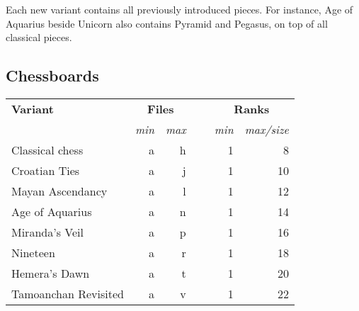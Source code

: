Each new variant contains all previously introduced pieces. For instance, Age of Aquarius
beside Unicorn also contains Pyramid and Pegasus, on top of all classical pieces.

\clearpage %

\subsection*{Chessboards}
\label{sec:Appendix/Introduction/Chessboards}

\begin{table}[!h]
\centering
\begin{tabular}{ lrrcrr }
\toprule %
\textbf{Variant}      & \multicolumn{2}{c}{ \textbf{Files} } & ~ & \multicolumn{2}{c}{ \textbf{Ranks} }   \\
                      \cmidrule{2-3}                             \cmidrule{5-6} %
                      & \emph{min} & \emph{max}              &   & \emph{min} & \emph{max/size}           \\
\midrule %
Classical chess       & a          & h                       &   & 1          &  8                        \\
Croatian Ties         & a          & j                       &   & 1          & 10                        \\
Mayan Ascendancy      & a          & l                       &   & 1          & 12                        \\
Age of Aquarius       & a          & n                       &   & 1          & 14                        \\
Miranda's Veil        & a          & p                       &   & 1          & 16                        \\
Nineteen              & a          & r                       &   & 1          & 18                        \\
Hemera's Dawn         & a          & t                       &   & 1          & 20                        \\
Tamoanchan Revisited  & a          & v                       &   & 1          & 22                        \\

\end{tabular}
\end{table}
